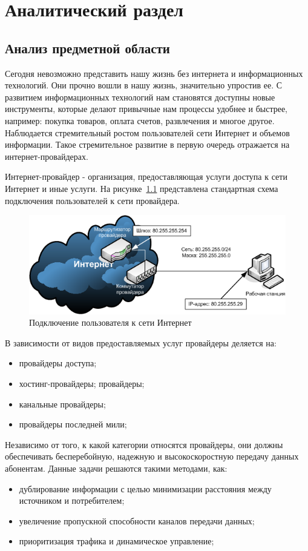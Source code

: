 \chapter{Аналитический раздел}
\label{cha:analysis}
\section{Анализ предметной области}
Сегодня невозможно представить нашу жизнь без интернета и информационных технологий. Они прочно вошли в нашу жизнь, значительно упростив ее. С развитием информационных технологий нам становятся доступны новые инструменты, которые делают привычные нам процессы удобнее и быстрее, например: покупка товаров, оплата счетов, развлечения и многое другое. Наблюдается стремительный ростом пользователей сети Интернет и объемов информации. Такое стремительное развитие в первую очередь отражается на интернет-провайдерах.

Интернет-провайдер - организация, предоставляющая услуги доступа к сети Интернет и иные услуги. На рисунке~\ref{pic:user_connection_schema} представлена стандартная схема подключения пользователей к сети провайдера.
\begin{figure}
\centering
\includegraphics[scale=0.7]{pictures/user_connection_schema}
\caption{Подключение пользователя к сети Интернет}
\label{pic:user_connection_schema}
\end{figure}

В зависимости от видов предоставляемых услуг провайдеры деляется на:
\begin{itemize}
\item провайдеры доступа;
\item хостинг-провайдеры;
 провайдеры;
\item канальные провайдеры;
\item провайдеры последней мили;
\end{itemize}

Независимо от того, к какой категории относятся провайдеры, они должны обеспечивать бесперебойную, надежную и высокоскоростную передачу данных абонентам. Данные задачи решаются такими методами, как:
\begin{itemize}
\item дублирование информации с целью минимизации расстояния между источником и потребителем;
\item увеличение пропускной способности каналов передачи данных;
\item приоритизация трафика и динамическое управление;
\end{itemize}

